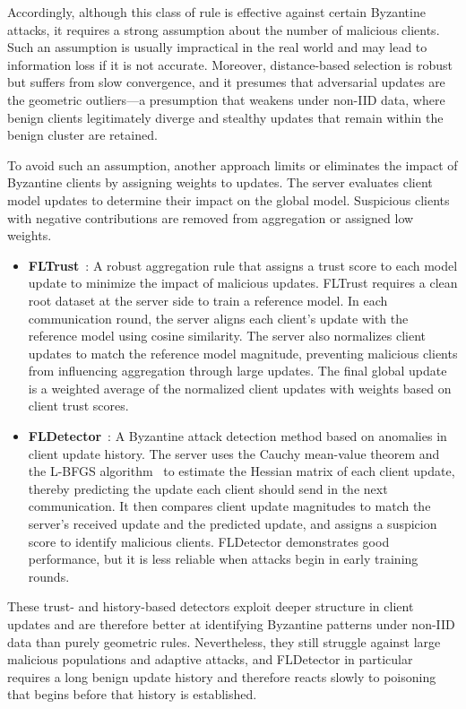 \documentclass[journal]{IEEEtran}
\begin{document}
Accordingly, although this class of rule is effective against certain Byzantine attacks, it requires a strong assumption about the number of malicious clients. Such an assumption is usually impractical in the real world and may lead to information loss if it is not accurate. Moreover, distance-based selection is robust but suffers from slow convergence, and it presumes that adversarial updates are the geometric outliers---a presumption that weakens under non-IID data, where benign clients legitimately diverge and stealthy updates that remain within the benign cluster are retained.

To avoid such an assumption, another approach limits or eliminates the impact of Byzantine clients by assigning weights to updates. The server evaluates client model updates to determine their impact on the global model. Suspicious clients with negative contributions are removed from aggregation or assigned low weights.

\begin{itemize}
    \item \textbf{FLTrust}~\cite{cao2020fltrust}: A robust aggregation rule that assigns a trust score to each model update to minimize the impact of malicious updates. FLTrust requires a clean root dataset at the server side to train a reference model. In each communication round, the server aligns each client's update with the reference model using cosine similarity. The server also normalizes client updates to match the reference model magnitude, preventing malicious clients from influencing aggregation through large updates. The final global update is a weighted average of the normalized client updates with weights based on client trust scores.

    \item \textbf{FLDetector}~\cite{zhang2022fldetector}: A Byzantine attack detection method based on anomalies in client update history. The server uses the Cauchy mean-value theorem and the L-BFGS algorithm~\cite{liu1989limited} to estimate the Hessian matrix of each client update, thereby predicting the update each client should send in the next communication. It then compares client update magnitudes to match the server's received update and the predicted update, and assigns a suspicion score to identify malicious clients. FLDetector demonstrates good performance, but it is less reliable when attacks begin in early training rounds.
\end{itemize}

These trust- and history-based detectors exploit deeper structure in client updates and are therefore better at identifying Byzantine patterns under non-IID data than purely geometric rules. Nevertheless, they still struggle against large malicious populations and adaptive attacks, and FLDetector in particular requires a long benign update history and therefore reacts slowly to poisoning that begins before that history is established.
\end{document}

